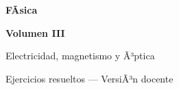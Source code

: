 ﻿\documentclass[11pt,letterpaper,openany]{book}
\newcommand{\numerovolumen}{III}
\newcommand{\nombrevolumen}{Electricidad, magnetismo y Ã³ptica}
\begin{document}

\begin{titlepage}

    \centering

    \vspace*{2.5cm}

    {\color{RojoPrincipal}
    \Huge\bfseries
    FÃ­sica
    \par}

    \vspace{0.8cm}

    {\color{AzulPrincipal}
    \LARGE\bfseries
    Volumen \numerovolumen
    \par}

    \vspace{0.5cm}

    {\Large
    \nombrevolumen
    \par}

    \vspace{1.5cm}

    {\color{AzulPrincipal}
    \Large
    Ejercicios resueltos --- VersiÃ³n docente
    \par}

    \vfill

    {\Large\bfseries
    \autorlibro
    \par}

    \vspace{2cm}

\end{titlepage}



\frontmatter

\tableofcontents

\cleardoublepage



\mainmatter
\end{document}
